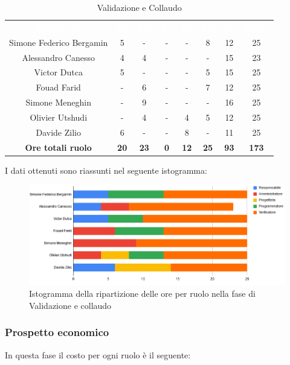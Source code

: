 \begin{table}[H]
\centering\renewcommand{\arraystretch}{1.5}
\caption{Validazione e Collaudo}
\vspace{0.2cm}
\begin{tabular}{ c c c c c c c c }
\rowcolor{redafk}
\textcolor{white}{\textbf{Nominativo}} & \textcolor{white}{\textbf{Re}} & 
\textcolor{white}{\textbf{Am}} & \textcolor{white}{\textbf{An}} &
\textcolor{white}{\textbf{Pt}} & \textcolor{white}{\textbf{Pm}} &
\textcolor{white}{\textbf{Ve}} & \textcolor{white}{\textbf{Totale}} \\
Simone Federico Bergamin 	& 5 	& - 	& - 	& - 	& 8 	& 12 	& 25 \\
Alessandro Canesso 			& 4 	& 4 	& - 	& - 	& - 	& 15 	& 23 \\
Victor Dutca 				& 5 	& - 	& - 	& - 	& 5 	& 15 	& 25 \\
Fouad Farid					& - 	& 6 	& - 	& - 	& 7 	& 12 	& 25 \\
Simone Meneghin 			& - 	& 9 	& - 	& - 	& - 	& 16 	& 25 \\
Olivier Utshudi 			& - 	& 4 	& - 	& 4 	& 5 	& 12 	& 25 \\
Davide Zilio 				& 6 	& - 	& - 	& 8 	& - 	& 11 	& 25 \\
\rowcolor{lastrowcolor}
\textbf{Ore totali ruolo} & \textbf{20} & \textbf{23} & \textbf{0} & \textbf{12} & \textbf{25} & \textbf{93} & \textbf{173} \\
\end{tabular}
\end{table}

I dati ottenuti sono riassunti nel seguente istogramma: 
\begin{figure}[H]
\centering
\includegraphics[scale=0.60]{img/grafici/tabella_fase_val_col.png}
\caption{Istogramma della ripartizione delle ore per ruolo nella fase di Validazione e collaudo}
\end{figure}

\subsubsection{Prospetto economico}
In questa fase il costo per ogni ruolo è il seguente:

